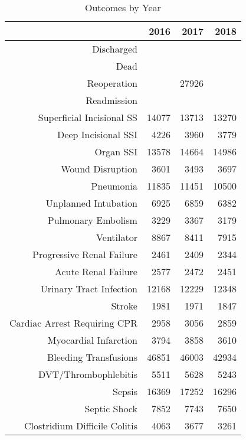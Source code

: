 \begin{table}[ht]
\centering
\begin{tabular}{rrrr}
  \hline
 & 2016 & 2017 & 2018 \\ 
  \hline
Discharged &  &  &  \\ 
  Dead &  &  &  \\ 
  Reoperation &  & 27926 &  \\ 
  Readmission &  &  &  \\ 
  Superficial Incisional SS & 14077 & 13713 & 13270 \\ 
  Deep Incisional SSI & 4226 & 3960 & 3779 \\ 
  Organ SSI & 13578 & 14664 & 14986 \\ 
  Wound Disruption & 3601 & 3493 & 3697 \\ 
  Pneumonia & 11835 & 11451 & 10500 \\ 
  Unplanned Intubation & 6925 & 6859 & 6382 \\ 
  Pulmonary Embolism & 3229 & 3367 & 3179 \\ 
  Ventilator & 8867 & 8411 & 7915 \\ 
  Progressive Renal Failure & 2461 & 2409 & 2344 \\ 
  Acute Renal Failure & 2577 & 2472 & 2451 \\ 
  Urinary Tract Infection & 12168 & 12229 & 12348 \\ 
  Stroke & 1981 & 1971 & 1847 \\ 
  Cardiac Arrest Requiring CPR & 2958 & 3056 & 2859 \\ 
  Myocardial Infarction & 3794 & 3858 & 3610 \\ 
  Bleeding Transfusions & 46851 & 46003 & 42934 \\ 
  DVT/Thrombophlebitis & 5511 & 5628 & 5243 \\ 
  Sepsis & 16369 & 17252 & 16296 \\ 
  Septic Shock & 7852 & 7743 & 7650 \\ 
  Clostridium Difficile Colitis & 4063 & 3677 & 3261 \\ 
   \hline
\end{tabular}
\caption{Outcomes by Year} 
\end{table}
